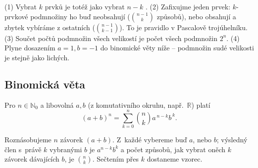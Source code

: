 \documentclass[11pt,a4paper]{article}
\begin{document}
\begin{intuice}
(1) Vybrat $k$ prvků  je totéž jako vybrat $n-k$ . (2) Zafixujme jeden prvek: $k$-prvkové podmnožiny ho buď neobsahují ($\binom{n-1}{k}$ způsobů), nebo obsahují a zbytek vybíráme z ostatních ($\binom{n-1}{k-1}$). To je pravidlo  v Pascalově trojúhelníku. (3) Součet počtů podmnožin všech velikostí je počet všech podmnožin $2^n$. (4) Plyne dosazením $a=1,b=-1$ do binomické věty níže -- podmnožin sudé velikosti je stejně jako lichých.
\end{intuice}

\begin{center}
\end{center}

\subsection{Binomická věta}

\begin{veta}
Pro $n\in\mathbb{N}_0$ a libovolná $a,b$ (z komutativního okruhu, např.\ $\mathbb{R}$) platí
\[
(a+b)^{n}=\sum_{k=0}^{n}\binom{n}{k}a^{\,n-k}b^{\,k}.
\]
\end{veta}

\begin{intuice}
Roznásobujeme $n$ závorek $(a+b)$. Z~každé vybereme buď $a$, nebo $b$; výsledný člen s~právě $k$ vybranými $b$ je $a^{n-k}b^{k}$ a počet způsobů, jak vybrat oněch $k$ závorek dávajících $b$, je $\binom{n}{k}$. Sečtením přes $k$ dostaneme vzorec.
\end{intuice}
\end{document}
